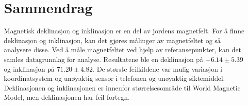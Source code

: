 
\section*{Sammendrag}

Magnetisk deklinasjon og inklinasjon er en del av jordens magnetfelt. For å finne deklinasjon og inklinasjon, kan det gjøres målinger av magnetfeltet og så analysere disse. Ved å måle magnetfeltet ved hjelp av referansepunkter, kan det samles datagrunnlag for analyse. Resultatene ble en deklinasjon på $-6.14\pm{5.39}$\textdegree og inklinasjon på $71.20\pm{4.82}$\textdegree. De største feilkildene var mulig variasjon i koordinatsystem og unøyaktig sensor i telefonen og unøyaktig siktemiddel. Deklinasjonen og inklinasjonen er innenfor størrelsesområde til World Magnetic Model, men deklinasjonen har feil fortegn.    


